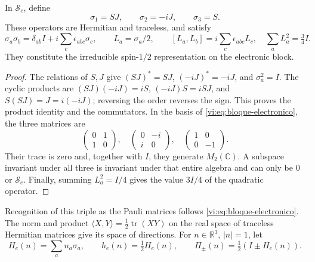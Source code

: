 \begin{proposition}
\label{vi:prop:spin}
In $\mathscr S_e$, define
\begin{equation}
 \sigma_1=SJ,\qquad \sigma_2=-iJ,\qquad \sigma_3=S.
 \label{vi:eq:terna}
\end{equation}
These operators are Hermitian and traceless, and satisfy
\begin{equation}
 \sigma_a\sigma_b=\delta_{ab}I+
 i\sum_c\epsilon_{abc}\sigma_c,
 \qquad L_a=\sigma_a/2,\qquad
 [L_a,L_b]=i\sum_c\epsilon_{abc}L_c,
 \quad\sum_aL_a^2=\tfrac34I.
 \label{vi:eq:spin-algebra}
\end{equation}
They constitute the irreducible spin-$1/2$ representation on
the electronic block.
\end{proposition}
\begin{proof}
The relations of $S,J$ give $(SJ)^*=SJ$, $(-iJ)^*=-iJ$, and
$\sigma_a^2=I$. The cyclic products are
$(SJ)(-iJ)=iS$, $(-iJ)S=iSJ$, and $S(SJ)=J=i(-iJ)$;
reversing the order reverses the sign. This proves the product
identity and the commutators. In the basis of
\eqref{vi:eq:bloque-electronico}, the three matrices are
\[
 \begin{pmatrix}0&1\\1&0\end{pmatrix},\quad
 \begin{pmatrix}0&-i\\i&0\end{pmatrix},\quad
 \begin{pmatrix}1&0\\0&-1\end{pmatrix}.
\]
Their trace is zero and, together with $I$, they generate $M_2(\mathbb C)$.
A subspace invariant under all three is invariant under that entire
algebra and can only be $0$ or $\mathscr S_e$. Finally,
summing $L_a^2=I/4$ gives the value $3I/4$ of the quadratic operator.
\end{proof}

Recognition of this triple as the Pauli matrices follows
\eqref{vi:eq:bloque-electronico}. The norm and product
$\langle X,Y\rangle=\tfrac12\operatorname{tr}(XY)$ on the
real space of traceless Hermitian matrices give its space
of directions. For $n\in\mathbb R^3$, $|n|=1$, let
\begin{equation}
 H_e(n)=\sum_an_a\sigma_a,\qquad
 h_e(n)=\tfrac12H_e(n),\qquad
 \Pi_\pm(n)=\tfrac12(I\pm H_e(n)).
 \label{vi:eq:helicidad}
\end{equation}

